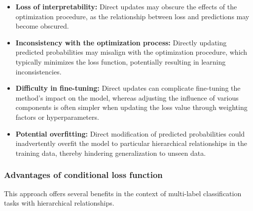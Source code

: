 \documentclass[preprint,3p,times, review]{elsarticle}
\begin{document}
\begin{itemize}
    \item \textbf{Loss of interpretability:} Direct updates may obscure the effects of the optimization procedure, as the relationship between loss and predictions may become obscured.

    \item \textbf{Inconsistency with the optimization process: }Directly updating predicted probabilities may misalign with the optimization procedure, which typically minimizes the loss function, potentially resulting in learning inconsistencies.

    \item \textbf{Difficulty in fine-tuning:} Direct updates can complicate fine-tuning the method's impact on the model, whereas adjusting the influence of various components is often simpler when updating the loss value through weighting factors or hyperparameters.

    \item \textbf{Potential overfitting:} Direct modification of predicted probabilities could inadvertently overfit the model to particular hierarchical relationships in the training data, thereby hindering generalization to unseen data.
\end{itemize}

\subsubsection{Advantages of conditional loss function}

This approach offers several benefits in the context of multi-label classification tasks with hierarchical relationships.
\end{document}
